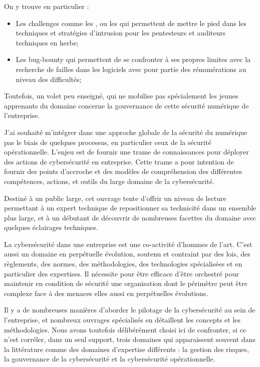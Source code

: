 On y trouve en particulier :

\begin{itemize}
  \item Les challenges comme les , ou les  qui permettent de mettre le pied dans les techniques et stratégies d'intrusion pour les pentesteurs et auditeurs techniques en herbe;
  \item Les bug-bounty qui permettent de se confronter à ses propres limites avec la recherche de failles dans les logiciels avec pour partie des rémunérations au niveau des difficultés;
\end{itemize}

Toutefois, un volet peu enseigné, qui ne mobilise pas spécialement les jeunes apprenants du domaine concerne la gouvernance de cette sécurité numérique de l'entreprise.

J'ai souhaité m'intégrer dans  une approche globale de la sécurité du numérique pas le biais de quelques processus, en particulier ceux de la sécurité opérationnelle. L'enjeu est de fournir une trame de connaissances pour déployer des actions de cybersécurité en entreprise.
Cette trame a pour intention de fournir des points d'accroche et des modèles de compréhension des différentes compétences, actions, et outils du large domaine de la cybersécurité.

Destiné à un public large, cet ouvrage tente d'offrir un niveau de lecture permettant à un expert technique de repositionner sa technicité dans un ensemble plus large, et  à un débutant de découvrir de nombreuses facettes du domaine avec quelques éclairages techniques.

La cybersécurité dans une entreprise est une co-activité d'hommes de l'art.  C'est aussi un domaine en perpétuelle évolution, soutenu et contraint par des lois, des règlements, des normes, des méthodologies,  des technologies spécialisées et en particulier des expertises.  Il nécessite pour être efficace d'être orchestré pour maintenir en condition de sécurité une organisation dont le périmètre peut être complexe face à des menaces elles aussi en perpétuelles évolutions.

Il y a de nombreuses manières d’aborder le pilotage de la cybersécurité au sein de l’entreprise, et nombreux ouvrages spécialisés en détaillent les concepts et les méthodologies. Nous avons toutefois délibérément choisi ici de confronter, si ce n'est corréler, dans un seul support, trois domaines qui apparaissent souvent dans la littérature comme des domaines d'expertise différents : la gestion des risques, la gouvernance de la cybersécurité et la cybersécurité opérationnelle. 

